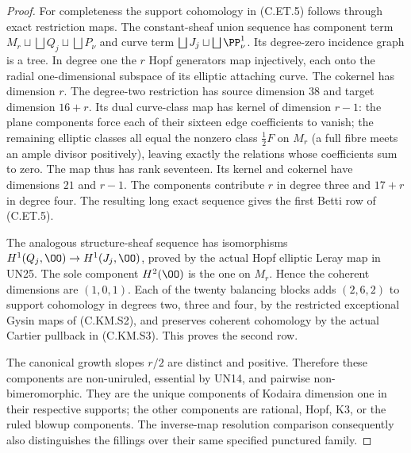 \begin{proof}
For completeness the support
cohomology in (C.ET.5) follows
through exact restriction maps.
The constant-sheaf union
sequence has component term
$M_r\sqcup\bigsqcup Q_j
\sqcup\bigsqcup P_\nu$
and curve term
$\bigsqcup J_j\sqcup
\bigsqcup\PP^1_\nu$.
Its degree-zero incidence
graph is a tree. In degree
one the $r$ Hopf generators
map injectively, each onto
the radial one-dimensional
subspace of its elliptic
attaching curve. The cokernel
has dimension $r$.
The degree-two restriction
has source dimension $38$
and target dimension $16+r$.
Its dual curve-class map
has kernel of dimension
$r-1$: the plane components
force each of their sixteen
edge coefficients to vanish;
the remaining elliptic
classes all equal the
nonzero class $\tfrac12F$
on $M_r$ (a full fibre meets
an ample divisor positively), leaving exactly
the relations whose
coefficients sum to zero.
The map thus has rank
seventeen. Its kernel
and cokernel have dimensions
$21$ and $r-1$.
The components contribute
$r$ in degree three and
$17+r$ in degree four.
The resulting long exact
sequence gives the first
Betti row of (C.ET.5).

The analogous structure-sheaf
sequence has isomorphisms
$H^1(Q_j,\OO)\to H^1(J_j,\OO)$,
proved by the actual Hopf
elliptic Leray map in UN25.
The sole component
$H^2(\OO)$ is the one
on $M_r$. Hence the
coherent dimensions are
$(1,0,1)$.
Each of the twenty
balancing blocks adds
$(2,6,2)$ to support
cohomology in degrees
two, three and four,
by the restricted
exceptional Gysin maps
of (C.KM.S2), and
preserves coherent
cohomology by the
actual Cartier pullback
in (C.KM.S3). This
proves the second row.

The canonical growth slopes
$r/2$ are distinct and
positive. Therefore these
components are non-uniruled,
essential by UN14, and
pairwise non-bimeromorphic.
They are the unique components
of Kodaira dimension one
in their respective supports;
the other components are
rational, Hopf, K3, or
the ruled blowup components.
The inverse-map resolution
comparison consequently
also distinguishes the
fillings over their same
specified punctured family.
\end{proof}
